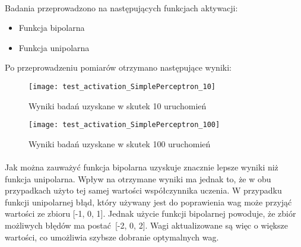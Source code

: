 \documentclass[\main/main.tex]{subfiles}
\begin{document}
    \paragraph{}
    Badania przeprowadzono na następujących funkcjach aktywacji:
    \begin{itemize}
     \item Funkcja bipolarna
     \item Funkcja unipolarna
    \end{itemize}
    
    Po przeprowadzeniu pomiarów otrzymano następujące wyniki:
    
    \begin{figure}[H]
    \centering
    \texttt{[image: test\_activation\_SimplePerceptron\_10]}
    \caption{Wyniki badań uzyskane w skutek 10 uruchomień}
    \end{figure}

    \begin{figure}[H]
    \centering
    \texttt{[image: test\_activation\_SimplePerceptron\_100]}
    \caption{Wyniki badań uzyskane w skutek 100 uruchomień}
    \end{figure}
    
    \paragraph{}
    \justify
    Jak można zauważyć funkcja bipolarna uzyskuje znacznie lepsze wyniki niż funkcja unipolarna. Wpływ na otrzymane wyniki ma jednak to, że w obu przypadkach użyto tej samej wartości współczynnika uczenia. W przypadku funkcji unipolarnej błąd, który używany jest do poprawienia wag może przyjąć wartości ze zbioru [-1, 0, 1]. Jednak użycie funkcji bipolarnej powoduje, że zbiór możliwych błędów ma postać [-2, 0, 2]. Wagi aktualizowane są więc o większe wartości, co umożliwia szybsze dobranie optymalnych wag.
    
\end{document}
